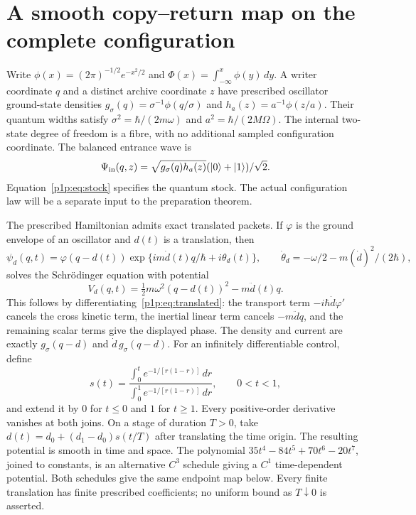 \documentclass[11pt]{article}
\numberwithin{equation}{section}
\theoremstyle{definition}
\theoremstyle{remark}
\begin{document}
\newcommand{\pTV}{\operatorname{TV}}
\newcommand{\pVar}{\operatorname{Var}}
\newcommand{\pLaw}{\operatorname{Law}}
\newcommand{\pGam}{\Gamma}
\newcommand{\pUnif}{\mathsf U}

\section{A smooth copy--return map on the complete configuration}
\label{p1p:sec:map}

Write $\phi(x)=(2\pi)^{-1/2}e^{-x^2/2}$ and
$\Phi(x)=\int_{-\infty}^x\phi(y)\,dy$. A writer coordinate $q$ and a distinct
archive coordinate $z$ have prescribed oscillator ground-state densities
$g_\sigma(q)=\sigma^{-1}\phi(q/\sigma)$ and
$h_a(z)=a^{-1}\phi(z/a)$. Their quantum widths satisfy
$\sigma^2=\hbar/(2m\omega)$ and $a^2=\hbar/(2M\Omega)$.
The internal two-state degree of freedom is a fibre, with no additional
sampled configuration coordinate. The balanced entrance wave is
\begin{equation}\label{p1p:eq:stock}
 \Psi_{\rm in}(q,z)=\sqrt{g_\sigma(q)h_a(z)}
 (|0\rangle+|1\rangle)/\sqrt2.
\end{equation}
Equation~\eqref{p1p:eq:stock} specifies the quantum stock. The actual
configuration law will be a separate input to the preparation theorem.

The prescribed Hamiltonian admits exact translated packets. If $\varphi$
is the ground envelope of an oscillator and $d(t)$ is a translation, then
\begin{equation}\label{p1p:eq:translated}
 \psi_d(q,t)=\varphi(q-d(t))
 \exp\{im\dot d(t)q/\hbar+i\theta_d(t)\},\qquad
 \dot\theta_d=-\omega/2-m(\dot d)^2/(2\hbar),
\end{equation}
solves the Schr\"odinger equation with potential
\begin{equation}\label{p1p:eq:potential}
 V_d(q,t)=\tfrac12m\omega^2(q-d(t))^2-m\ddot d(t)q.
\end{equation}
This follows by differentiating~\eqref{p1p:eq:translated}: the transport
term $-i\hbar\dot d\varphi'$ cancels the cross kinetic term, the inertial
linear term cancels $-m\ddot d q$, and the remaining scalar terms give the
displayed phase. The density and current are exactly
$g_\sigma(q-d)$ and $\dot d\,g_\sigma(q-d)$.
For an infinitely differentiable control, define
\begin{equation}\label{eq:smooth-step}
 s(t)=\frac{\displaystyle\int_0^t e^{-1/[r(1-r)]}\,dr}
 {\displaystyle\int_0^1 e^{-1/[r(1-r)]}\,dr},\qquad 0<t<1,
\end{equation}
and extend it by $0$ for $t\leq0$ and $1$ for $t\geq1$.
Every positive-order derivative vanishes at both joins. On a stage of
duration $T>0$, take $d(t)=d_0+(d_1-d_0)s(t/T)$ after translating the
time origin. The resulting potential is smooth in time and space.
The polynomial $35t^4-84t^5+70t^6-20t^7$, joined to constants, is an
alternative $C^3$ schedule giving a $C^1$ time-dependent potential.
Both schedules give the same endpoint map below. Every finite translation
has finite prescribed coefficients; no uniform bound as $T\downarrow0$
is asserted.
\end{document}
